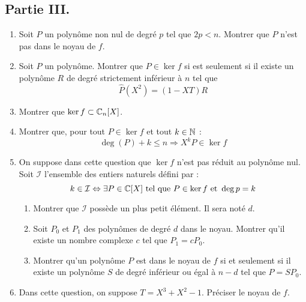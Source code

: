 \subsection*{Partie III.}
\begin{enumerate}
 \item Soit $P$ un polynôme non nul de degré $p$ tel que $2p<n$. Montrer que $P$ n'est pas dans le noyau de $f$.
\item Soit $P$ un polynôme. Montrer que $P\in\ker f$ si est seulement si il existe un polynôme $R$ de degré strictement inférieur à $n$ tel que
\begin{displaymath}
 \widehat{P}(X^2)=(1-XT)R
\end{displaymath}
\item Montrer que $\ker f \subset \mathbb{C}_n[X]$.
\item Montrer que, pour tout $P\in \ker f$ et tout $k\in \mathbb{N}$ :
\begin{displaymath}
 \deg(P) + k \leq n \Rightarrow X^k P \in \ker f
\end{displaymath}
\item On suppose dans cette question que $\ker f$ n'est pas réduit au polynôme nul. Soit $\mathcal I$ l'ensemble des entiers naturels défini par :
\begin{displaymath}
 k\in \mathcal I \Leftrightarrow \exists P\in \mathbb{C}[X] \text{ tel que } P\in \ker f \text{ et } \deg p=k
\end{displaymath}
\begin{enumerate}
 \item Montrer que $\mathcal I$ possède un plus petit élément. Il sera noté $d$. 
\item Soit $P_0$ et $P_1$ des polynômes de degré $d$ dans le noyau. Montrer qu'il existe un nombre complexe $c$ tel que $P_1=cP_0$. 
\item Montrer qu'un polynôme $P$ est dans le noyau de $f$ si et seulement si il existe un polynôme $S$ de degré inférieur ou égal à $n-d$ tel que $P=SP_0$.
\end{enumerate}
\item Dans cette question, on suppose $T=X^3+X^2-1$. Préciser le noyau de $f$.
\end{enumerate}

